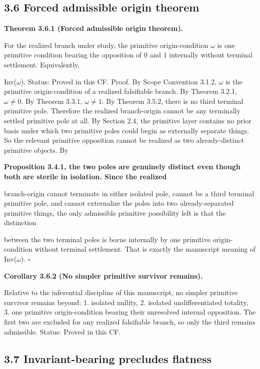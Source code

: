\documentclass[11pt]{article}
\begin{document}
\subsection{3.6 Forced admissible origin theorem}\label{forced-admissible-origin-theorem}

\textbf{Theorem 3.6.1 (Forced admissible origin theorem).}

For the realized branch under study, the primitive origin-condition $\omega$ is one primitive condition bearing the opposition of 0 and 1 internally without terminal settlement. Equivalently,

Inv($\omega$). Status: Proved in this CF. Proof. By Scope Convention 3.1.2, $\omega$ is the primitive origin-condition of a realized falsifiable branch. By Theorem 3.2.1, $\omega \neq 0$. By Theorem 3.3.1, $\omega \neq 1$. By Theorem 3.5.2, there is no third terminal primitive pole. Therefore the realized branch-origin cannot be any terminally settled primitive pole at all. By Section 2.4, the primitive layer contains no prior basis under which two primitive poles could begin as externally separate things. So the relevant primitive opposition cannot be realized as two already-distinct primitive objects. By

\textbf{Proposition 3.4.1, the two poles are genuinely distinct even though both are sterile in isolation. Since the realized}

branch-origin cannot terminate in either isolated pole, cannot be a third terminal primitive pole, and cannot externalize the poles into two already-separated primitive things, the only admissible primitive possibility left is that the distinction

between the two terminal poles is borne internally by one primitive origin-condition without terminal settlement. That is exactly the manuscript meaning of Inv($\omega$). $\square$

\textbf{Corollary 3.6.2 (No simpler primitive survivor remains).}

Relative to the inferential discipline of this manuscript, no simpler primitive survivor remains beyond: 1. isolated nullity, 2. isolated undifferentiated totality, 3. one primitive origin-condition bearing their unresolved internal opposition. The first two are excluded for any realized falsifiable branch, so only the third remains admissible. Status: Proved in this CF.

\subsection{3.7 Invariant-bearing precludes flatness}\label{invariant-bearing-precludes-flatness}
\end{document}
